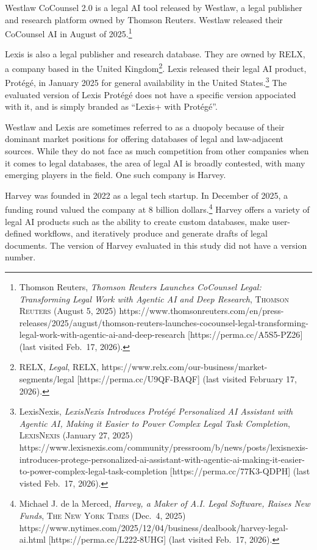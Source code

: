 \documentclass[
]{article}
\begin{document}
Westlaw CoCounsel 2.0 is a legal AI tool released by Westlaw, a legal
publisher and research platform owned by Thomson Reuters. Westlaw
released their CoCounsel AI in August of 2025.\footnote{Thomson Reuters,
  \emph{Thomson Reuters Launches CoCounsel Legal: Transforming Legal
  Work with Agentic AI and Deep Research}, \textsc{Thomson Reuters}
  (August 5, 2025)
  https://www.thomsonreuters.com/en/press-releases/2025/august/thomson-reuters-launches-cocounsel-legal-transforming-legal-work-with-agentic-ai-and-deep-research
  {[}https://perma.cc/A5S5-PZ26{]} (last visited Feb.~17, 2026).}

Lexis is also a legal publisher and research database. They are owned by
RELX, a company based in the United Kingdom\footnote{RELX, \emph{Legal},
  \textsc{RELX}, https://www.relx.com/our-business/market-segments/legal
  {[}https://perma.cc/U9QF-BAQF{]} (last visited February 17, 2026).}.
Lexis released their legal AI product, Protégé, in January 2025 for
general availability in the United States.\footnote{LexisNexis,
  \emph{LexisNexis Introduces Protégé Personalized AI Assistant with
  Agentic AI, Making it Easier to Power Complex Legal Task Completion},
  \textsc{LexisNexis} (January 27, 2025)
  https://www.lexisnexis.com/community/pressroom/b/news/posts/lexisnexis-introduces-protege-personalized-ai-assistant-with-agentic-ai-making-it-easier-to-power-complex-legal-task-completion
  {[}https://perma.cc/77K3-QDPH{]} (last visted Feb.~17, 2026).} The
evaluated version of Lexis Protégé does not have a specific version
appociated with it, and is simply branded as ``Lexis+ with Protégé''.

Westlaw and Lexis are sometimes referred to as a duopoly because of
their dominant market positions for offering databases of legal and
law-adjacent sources. While they do not face as much competition from
other companies when it comes to legal databases, the area of legal AI
is broadly contested, with many emerging players in the field. One such
company is Harvey.

Harvey was founded in 2022 as a legal tech startup. In December of 2025,
a funding round valued the company at 8 billion dollars.\footnote{Michael
  J. de la Merced, \emph{Harvey, a Maker of A.I. Legal Software, Raises
  New Funds}, \textsc{The New York Times} (Dec.~4, 2025)
  https://www.nytimes.com/2025/12/04/business/dealbook/harvey-legal-ai.html
  {[}https://perma.cc/L222-8UHG{]} (last visited Feb.~17, 2026).} Harvey
offers a variety of legal AI products such as the ability to create
custom databases, make user-defined workflows, and iteratively produce
and generate drafts of legal documents. The version of Harvey evaluated
in this study did not have a version number.
\end{document}
